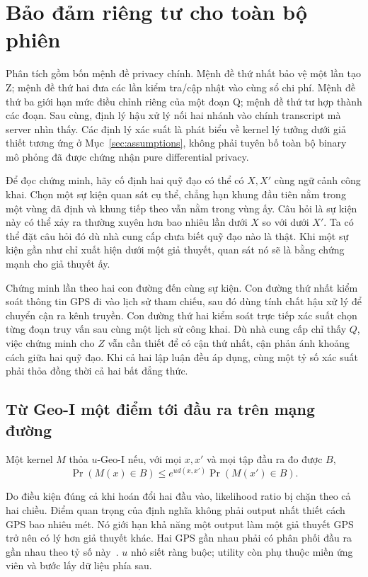 \section{Bảo đảm riêng tư cho toàn bộ phiên}\label{sec:privacy}
Phân tích gồm bốn mệnh đề privacy chính. Mệnh đề thứ nhất bảo vệ một lần tạo Z; mệnh đề thứ
hai đưa các lần kiểm tra/cập nhật vào cùng sổ chi phí. Mệnh đề thứ ba giới hạn mức điều chỉnh riêng
của một đoạn Q; mệnh đề thứ tư hợp thành các đoạn. Sau cùng, định lý hậu xử lý nối hai nhánh vào
chính transcript mà server nhìn thấy. Các định lý xác suất là phát biểu về kernel lý tưởng dưới
giả thiết tương ứng ở Mục~\ref{sec:assumptions}, không phải tuyên bố toàn bộ binary mô phỏng đã được
chứng nhận pure differential privacy.

Để đọc chứng minh, hãy cố định hai quỹ đạo có thể có $X,X'$ cùng ngữ cảnh công khai. Chọn
một sự kiện quan sát cụ thể, chẳng hạn khung đầu tiên nằm trong một vùng đã định và khung
tiếp theo vẫn nằm trong vùng ấy. Câu hỏi là sự kiện này có thể xảy ra thường xuyên hơn bao
nhiêu lần dưới $X$ so với dưới $X'$. Ta có thể đặt câu hỏi đó dù nhà cung cấp chưa biết
quỹ đạo nào là thật. Khi một sự kiện gần như chỉ xuất hiện dưới một giả thuyết, quan sát nó
sẽ là bằng chứng mạnh cho giả thuyết ấy.

Chứng minh lần theo hai con đường đến cùng sự kiện. Con đường thứ nhất kiểm soát thông tin
GPS đi vào lịch sử tham chiếu, sau đó dùng tính chất hậu xử lý để chuyển cận ra kênh truyền.
Con đường thứ hai kiểm soát trực tiếp xác suất chọn từng đoạn truy vấn sau cùng một lịch sử
công khai. Dù nhà cung cấp chỉ thấy $Q$, việc chứng minh cho $Z$ vẫn cần thiết để có cận thứ
nhất, cận phản ánh khoảng cách giữa hai quỹ đạo. Khi cả hai lập luận đều áp dụng, cùng một
tỷ số xác suất phải thỏa đồng thời cả hai bất đẳng thức.

\subsection{Từ Geo-I một điểm tới đầu ra trên mạng đường}
\begin{definition}
Một kernel $M$ thỏa $u$-Geo-I nếu, với mọi $x,x'$ và mọi tập đầu ra đo được $B$,
\begin{equation}
\Pr(M(x)\in B)\le e^{u d(x,x')}\Pr(M(x')\in B).
\label{eq:geoi-definition}
\end{equation}
\end{definition}
Do điều kiện đúng cả khi hoán đổi hai đầu vào, likelihood ratio bị chặn theo cả hai chiều.
Điểm quan trọng của định nghĩa không phải output nhất thiết cách GPS bao nhiêu mét. Nó giới hạn
khả năng một output làm một giả thuyết GPS trở nên có lý hơn giả thuyết khác. Hai GPS gần nhau
phải có phân phối đầu ra gần nhau theo tỷ số này~\cite{geoi}. $u$ nhỏ siết ràng buộc; utility còn
phụ thuộc miền ứng viên và bước lấy dữ liệu phía sau.

